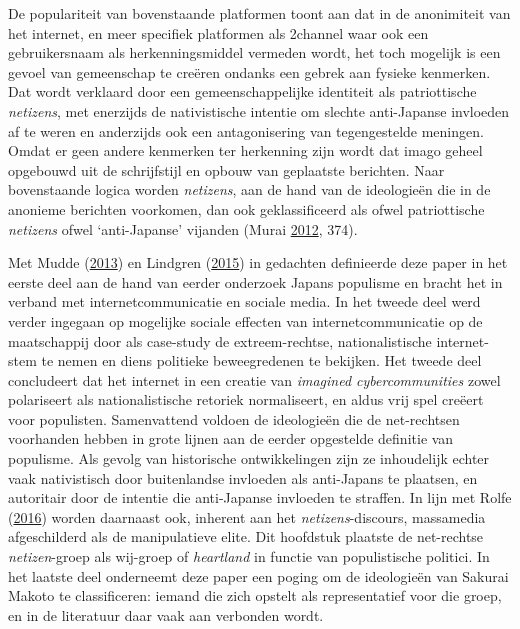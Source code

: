 \documentclass[10.5pt,dutch,]{article}
\begin{document}
De populariteit van bovenstaande platformen toont aan dat in de
anonimiteit van het internet, en meer specifiek platformen als 2channel
waar ook een gebruikersnaam als herkenningsmiddel vermeden wordt, het
toch mogelijk is een gevoel van gemeenschap te creëren ondanks een
gebrek aan fysieke kenmerken. Dat wordt verklaard door een
gemeenschappelijke identiteit als patriottische \emph{netizens}, met
enerzijds de nativistische intentie om slechte anti-Japanse invloeden af
te weren en anderzijds ook een antagonisering van tegengestelde
meningen. Omdat er geen andere kenmerken ter herkenning zijn wordt dat
imago geheel opgebouwd uit de schrijfstijl en opbouw van geplaatste
berichten. Naar bovenstaande logica worden \emph{netizens}, aan de hand
van de ideologieën die in de anonieme berichten voorkomen, dan ook
geklassificeerd als ofwel patriottische \emph{netizens} ofwel
`anti-Japanse' vijanden (Murai
\protect\hyperlink{ref-muraiux5fnetux5f2012}{2012}, 374).

Met Mudde (\protect\hyperlink{ref-muddeux5foxfordux5f2013}{2013}) en
Lindgren (\protect\hyperlink{ref-lindgrenux5fdevelopingux5f2015}{2015})
in gedachten definieerde deze paper in het eerste deel aan de hand van
eerder onderzoek Japans populisme en bracht het in verband met
internetcommunicatie en sociale media. In het tweede deel werd verder
ingegaan op mogelijke sociale effecten van internetcommunicatie op de
maatschappij door als case-study de extreem-rechtse, nationalistische
internet-stem te nemen en diens politieke beweegredenen te bekijken. Het
tweede deel concludeert dat het internet in een creatie van
\emph{imagined cybercommunities} zowel polariseert als nationalistische
retoriek normaliseert, en aldus vrij spel creëert voor populisten.
Samenvattend voldoen de ideologieën die de net-rechtsen voorhanden
hebben in grote lijnen aan de eerder opgestelde definitie van populisme.
Als gevolg van historische ontwikkelingen zijn ze inhoudelijk echter
vaak nativistisch door buitenlandse invloeden als anti-Japans te
plaatsen, en autoritair door de intentie die anti-Japanse invloeden te
straffen. In lijn met Rolfe
(\protect\hyperlink{ref-rolfeux5freinventionux5f2016}{2016}) worden
daarnaast ook, inherent aan het \emph{netizens}-discours, massamedia
afgeschilderd als de manipulatieve elite. Dit hoofdstuk plaatste de net-rechtse \emph{netizen}-groep als wij-groep of \emph{heartland} in
functie van populistische politici. In het laatste deel onderneemt deze
paper een poging om de ideologieën van Sakurai Makoto te classificeren:
iemand die zich opstelt als representatief voor die groep, en in de
literatuur daar vaak aan verbonden wordt.
\end{document}
